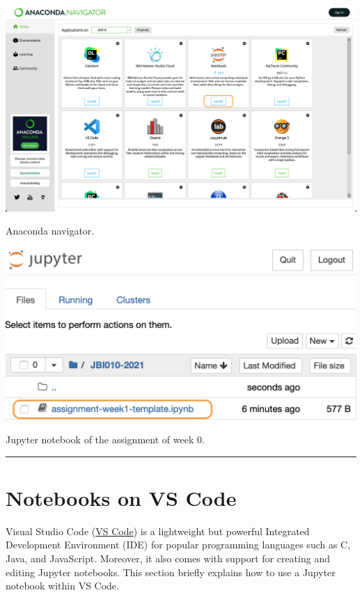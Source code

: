 \documentclass{latex-template/tufte-handout}
\begin{document}
\begin{marginfigure}%
  \includegraphics[width=1.3\linewidth]{assets/06-launch-jupyter}
  \caption{Anaconda navigator.}
  \label{fig:anaconda-navigator}
\end{marginfigure}



\begin{marginfigure}%
  \includegraphics[width=1.2\linewidth]{assets/open-nb}
  \caption{Jupyter notebook of the assignment of week 0.}
  \label{fig:week-0}
\end{marginfigure}

\begin{center}\rule{\linewidth}{0.5pt}\end{center}


\section{Notebooks on VS Code}
Visual Studio Code (\href{https://code.visualstudio.com/}{VS Code}) is a lightweight but powerful Integrated Development Environment (IDE) for popular programming languages such as C, Java, and JavaScript. 
Moreover, it also comes with support for creating and editing Jupyter notebooks.
This section briefly explains how to use a Jupyter notebook within VS Code.
\end{document}
